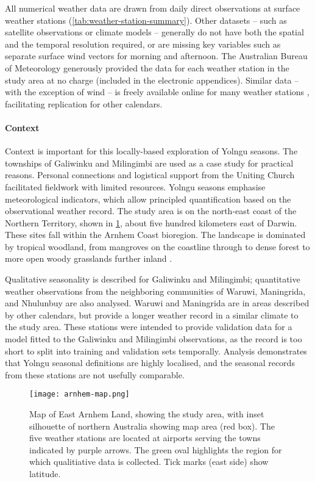 All numerical weather data are drawn from daily direct observations at
surface weather stations (\cref{tab:weather-station-summary}).
Other datasets -- such as satellite observations or
climate models -- generally do not have both the spatial and the
temporal resolution required, or are missing key variables such as separate
surface wind vectors for morning and afternoon.
%
%
The Australian Bureau of Meteorology generously provided the data for each
weather station in the study area at no charge (included in the electronic appendices).
Similar data -- with the exception of wind -- is freely available online
for many weather stations , facilitating replication for other
calendars.


\paragraph{Context}
Context is important for this locally-based exploration of Yolngu seasons.
The townships of Galiwinku and Milingimbi are used as a case study for
practical reasons.  Personal connections and
logistical support from the Uniting Church facilitated fieldwork with limited
resources.  Yolngu seasons emphasise meteorological indicators, which allow
principled quantification based on the observational weather record.
%
The study area is on the north-east coast of the Northern Territory, shown
in  \cref{fig:arnhem-map}, about five hundred kilometers east of Darwin.
These sites fall within the Arnhem Coast bioregion.  The landscape is
dominated by tropical woodland, from mangroves on the coastline through
to dense forest to more open woody grasslands further inland \citep{ens2014}.


Qualitative seasonality is described for Galiwinku and Milingimbi;
quantitative weather observations from the neighboring communities of Waruwi, Maningrida, and Nhulunbuy
are also analysed.  Waruwi and Maningrida are in areas described by
other calendars, but provide a longer weather record in a similar climate
to the study area.
%
These stations were intended to provide validation data for a model fitted
to the Galiwinku and Milingimbi observations, as the record is too short to
split into training and validation sets temporally.  Analysis demonstrates
that Yolngu seasonal definitions are highly localised, and the seasonal
records from these stations are not usefully comparable.


\begin{figure}[t]
    \centering
    \texttt{[image: arnhem-map.png]}
    \caption[Map of East Arnhem Land, showing the study area]{
        Map of East Arnhem Land, showing the study area, with inset silhouette
        of northern Australia showing map area (red box).  The five weather
        stations are located at airports serving the towns indicated by purple
        arrows.  The green oval highlights the region for which qualitiative
        data is collected.  Tick marks (east side) show latitude.}
    \label{fig:arnhem-map}
\end{figure}



